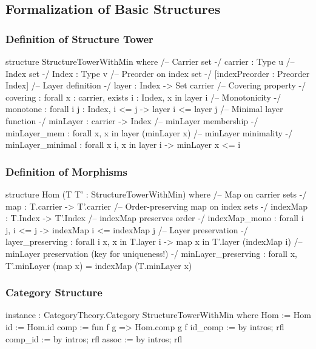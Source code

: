 \documentclass[11pt,a4paper]{article}
\theoremstyle{plain}
\theoremstyle{definition}
\begin{document}
\subsection{Formalization of Basic Structures}

\subsubsection{Definition of Structure Tower}

\begin{leancode}
structure StructureTowerWithMin where
  /-- Carrier set -/
  carrier : Type u
  /-- Index set -/
  Index : Type v
  /-- Preorder on index set -/
  [indexPreorder : Preorder Index]
  /-- Layer definition -/
  layer : Index -> Set carrier
  /-- Covering property -/
  covering : forall x : carrier, exists i : Index, x in layer i
  /-- Monotonicity -/
  monotone : forall {i j : Index}, i <= j -> layer i <= layer j
  /-- Minimal layer function -/
  minLayer : carrier -> Index
  /-- minLayer membership -/
  minLayer_mem : forall x, x in layer (minLayer x)
  /-- minLayer minimality -/
  minLayer_minimal : forall x i, x in layer i -> minLayer x <= i
\end{leancode}

\subsubsection{Definition of Morphisms}

\begin{leancode}
structure Hom (T T' : StructureTowerWithMin) where
  /-- Map on carrier sets -/
  map : T.carrier -> T'.carrier
  /-- Order-preserving map on index sets -/
  indexMap : T.Index -> T'.Index
  /-- indexMap preserves order -/
  indexMap_mono : forall {i j}, i <= j -> indexMap i <= indexMap j
  /-- Layer preservation -/
  layer_preserving : forall i x, x in T.layer i -> 
                     map x in T'.layer (indexMap i)
  /-- minLayer preservation (key for uniqueness!) -/
  minLayer_preserving : forall x, 
                        T'.minLayer (map x) = indexMap (T.minLayer x)
\end{leancode}

\subsubsection{Category Structure}

\begin{leancode}
instance : CategoryTheory.Category StructureTowerWithMin where
  Hom := Hom
  id := Hom.id
  comp := fun f g => Hom.comp g f
  id_comp := by intros; rfl
  comp_id := by intros; rfl
  assoc := by intros; rfl
\end{leancode}
\end{document}
